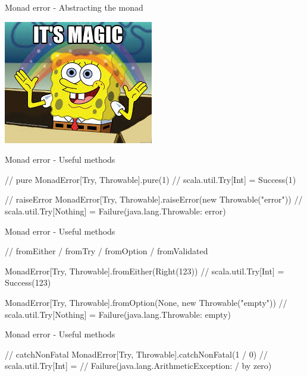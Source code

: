 \documentclass[13pt]{beamer}
\begin{document}
\begin{frame}{Monad error - Abstracting the monad}

  \begin{center}
    \includegraphics[scale=0.66]{figures/magic.jpeg}
  \end{center}

\end{frame}


\begin{frame}[fragile]{Monad error - Useful methods}
  \begin{scalaCode}

  // pure
  MonadError[Try, Throwable].pure(1)
  // scala.util.Try[Int] = Success(1)

  // raiseError
  MonadError[Try, Throwable].raiseError(new Throwable("error"))
  // scala.util.Try[Nothing] = Failure(java.lang.Throwable: error)
 
  \end{scalaCode}
\end{frame}


\begin{frame}[fragile]{Monad error - Useful methods}
  \begin{scalaCode}
  // fromEither / fromTry / fromOption / fromValidated

  MonadError[Try, Throwable].fromEither(Right(123)) 
  // scala.util.Try[Int] = Success(123)

  MonadError[Try, Throwable].fromOption(None, new Throwable("empty"))
  // scala.util.Try[Nothing] = Failure(java.lang.Throwable: empty)
 
  \end{scalaCode}

\end{frame}

\begin{frame}[fragile]{Monad error - Useful methods}
  \begin{scalaCode}

  // catchNonFatal
  MonadError[Try, Throwable].catchNonFatal(1 / 0)
  // scala.util.Try[Int] =
  //    Failure(java.lang.ArithmeticException: / by zero)
  \end{scalaCode}

\end{frame}
\end{document}
